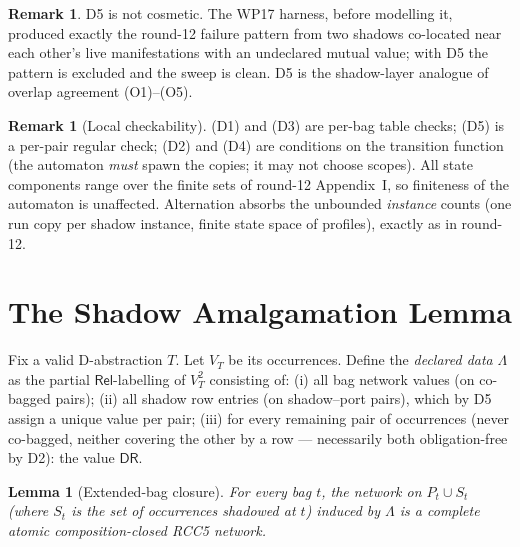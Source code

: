 \documentclass[11pt]{article}
\newtheorem{lemma}[theorem]{Lemma}
\theoremstyle{definition}
\newtheorem{remark}[theorem]{Remark}
\newcommand{\DR}{\mathsf{DR}}
\newcommand{\Rel}{\mathsf{Rel}}
\begin{document}
\begin{remark}
D5 is not cosmetic.  The WP17 harness, before modelling it, produced
exactly the round-12 failure pattern from two shadows co-located near
each other's live manifestations with an undeclared mutual value; with D5
the pattern is excluded and the sweep is clean.  D5 is the shadow-layer
analogue of overlap agreement (O1)--(O5).
\end{remark}

\begin{remark}[Local checkability]
(D1) and (D3) are per-bag table checks; (D5) is a per-pair regular check;
(D2) and (D4) are conditions on the transition function (the automaton
\emph{must} spawn the copies; it may not choose scopes).  All state
components range over the finite sets of round-12 Appendix~I, so
finiteness of the automaton is unaffected.  Alternation absorbs the
unbounded \emph{instance} counts (one run copy per shadow instance,
finite state space of profiles), exactly as in round-12.
\end{remark}

\section{The Shadow Amalgamation Lemma}\label{sec:sal}

Fix a valid D-abstraction $T$.  Let $V_T$ be its occurrences.  Define the
\emph{declared data} $\Lambda$ as the partial $\Rel$-labelling of
$V_T^2$ consisting of:
(i) all bag network values (on co-bagged pairs);
(ii) all shadow row entries (on shadow--port pairs), which by D5 assign a
unique value per pair;
(iii) for every remaining pair of occurrences (never co-bagged, neither
covering the other by a row --- necessarily both obligation-free by D2):
the value $\DR$.

\begin{lemma}[Extended-bag closure]\label{lem:ext-closed}
For every bag $t$, the network on $P_t\cup S_t$ (where $S_t$ is the set of
occurrences shadowed at $t$) induced by $\Lambda$ is a complete atomic
composition-closed RCC5 network.
\end{lemma}
\end{document}

